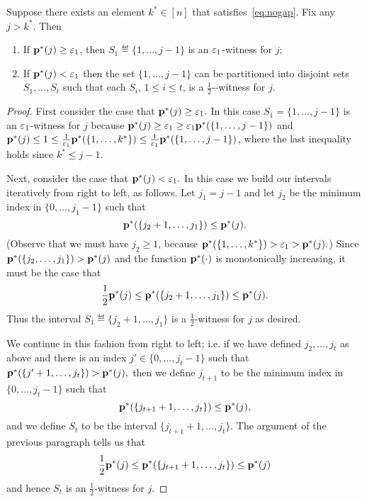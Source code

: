 \begin{claim} \label{claim:partition}
Suppose there exists an element $k^\ast \in [n]$
that satisfies~\cref{eq:nogap}.
Fix any $j > k^\ast.$  Then

\begin{enumerate}
\item If $\D^\ast(j) \geq {\eps_1}$, then $S_1 \eqdef \{1,\dots,j-1\}$ is an
${\varepsilon_1}$-\good witness for $j$;
\item If $\mathbf{p}^\ast(j) < {\varepsilon_1}$ then the set $\{1,\dots,j-1\}$ can be partitioned
into disjoint sets $S_1,\dots,S_t$ such that each
$S_i$, $1 \leq i \leq t$, is a ${\frac{1}2}$-\good-witness for $j$.
\end{enumerate}

\end{claim}
\begin{proof}
First consider the case that $\D^\ast(j)\geq {\eps_1}.$  In this case $S_1=\{1,\dots,j-1\}$  is an ${\varepsilon_1}$-\good witness
for $j$ because $\D^\ast(j) \geq {\eps_1} \geq {\eps_1} \D^\ast(\{1,\dots,j-1\})$
and $\D^\ast(j) \leq 1 \leq {\frac{1}{{\eps_1}}} \D^\ast(\{1,\dots,k^\ast\}) \leq {\frac{1}{{\eps_1}}} \D^\ast(\{1,\dots,j-1\})$,
where the last inequality holds since $k^\ast \leq j-1$.

Next, consider the case that $\mathbf{p}^\ast(j) < {\varepsilon_1}.$  In this case we build our
intervals iteratively from right to left, as follows.  Let $j_1=j-1$
and let $j_2$ be the minimum index in $\{0,\dots,j_1-1\}$
such that
\[ \mathbf{p}^\ast(\{j_2+1,\dots,j_1\}) \leq \mathbf{p}^\ast(j). \]
(Observe that we must have $j_2 \geq 1$, because $\mathbf{p}^\ast(\{1,\dots,k^\ast\})
> {\varepsilon_1} > \mathbf{p}^\ast(j).$)  Since \mbox{$\mathbf{p}^\ast(\{j_2,\dots,j_1\}) > \mathbf{p}^\ast(j)$}
and the function $\mathbf{p}^\ast(\cdot)$ is monotonically increasing, it must be the
case that
\[
\frac{1}{2}\mathbf{p}^\ast(j) \leq \mathbf{p}^\ast(\{j_2+1,\dots,j_1\}) \leq \mathbf{p}^\ast(j).
\]
Thus the interval $S_1 \eqdef \{j_2+1,\dots,j_1\}$ is
a ${\frac{1}2}$-\good witness for $j$ as desired.

We continue in this fashion from right to left; i.e. if
we have defined $j_2,\dots,j_t$ as above and there is an index $j'
\in \{0,\dots,j_t-1\}$ such that
$
\mathbf{p}^\ast(\{j'+1,\dots,j_t\}) > \mathbf{p}^\ast(j),
$
then we define $j_{t+1}$ to be the minimum index in $\{0,\dots,j_{t}-1\}$
such that
\[
\mathbf{p}^\ast(\{j_{t+1}+1,\dots,j_t\}) \leq \mathbf{p}^\ast(j),
\]
and we define
$S_{t}$ to be the interval $\{j_{t+1}+1,\dots,j_t\}$.
The argument of the previous paragraph tells us that
\begin{equation} \label{eq:comp}
\frac{1}{2}\mathbf{p}^\ast(j) \leq
\mathbf{p}^\ast(\{j_{t+1}+1,\dots,j_t\}) \leq
\mathbf{p}^\ast(j)
\end{equation}
and hence $S_{t}$ is an ${\frac{1}2}$-\good witness for $j$.



\end{proof}

